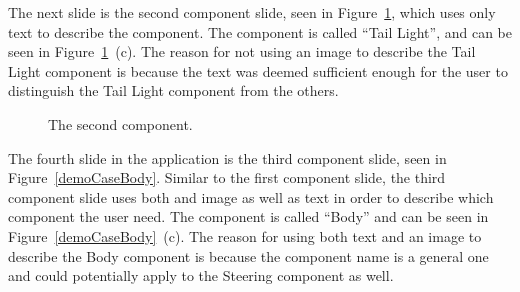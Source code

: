 The next slide is the second component slide, seen in Figure~\ref{demoCaseTailLight}, which uses only text to describe the component. The component is called ``Tail Light'', and can be seen in Figure~\ref{demoCaseTailLight}~(c). The reason for not using an image to describe the Tail Light component is because the text was deemed sufficient enough for the user to distinguish the Tail Light component from the others.

	\begin{figure}[ht!]
		\centering
		\qquad
		\qquad
		\caption{The second component.}
		\label{demoCaseTailLight}
	\end{figure}

The fourth slide in the application is the third component slide, seen in Figure~\ref{demoCaseBody}. Similar to the first component slide, the third component slide uses both and image as well as text in order to describe which component the user need. The component is called ``Body'' and can be seen in Figure~\ref{demoCaseBody}~(c). The reason for using both text and an image to describe the Body component is because the component name is a general one and could potentially apply to the Steering component as well.

